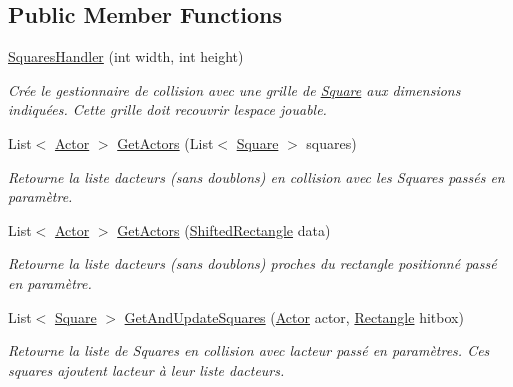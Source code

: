 \subsection*{Public Member Functions}
\begin{DoxyCompactItemize}
\item 
\hyperlink{class_tentacle_slicers_1_1maps_1_1_squares_handler_a359564e42a93abcbfab17e27a96923c0}{Squares\+Handler} (int width, int height)
\begin{DoxyCompactList}\small\item\em Crée le gestionnaire de collision avec une grille de \hyperlink{class_tentacle_slicers_1_1maps_1_1_square}{Square} aux dimensions indiquées. Cette grille doit recouvrir l\textquotesingle{}espace jouable. \end{DoxyCompactList}\item 
List$<$ \hyperlink{class_tentacle_slicers_1_1actors_1_1_actor}{Actor} $>$ \hyperlink{class_tentacle_slicers_1_1maps_1_1_squares_handler_a757757f75b4fc5fd74739f3d55ea7e00}{Get\+Actors} (List$<$ \hyperlink{class_tentacle_slicers_1_1maps_1_1_square}{Square} $>$ squares)
\begin{DoxyCompactList}\small\item\em Retourne la liste d\textquotesingle{}acteurs (sans doublons) en collision avec les Squares passés en paramètre. \end{DoxyCompactList}\item 
List$<$ \hyperlink{class_tentacle_slicers_1_1actors_1_1_actor}{Actor} $>$ \hyperlink{class_tentacle_slicers_1_1maps_1_1_squares_handler_a80e39f9258518ba76d3a8f82ffff0947}{Get\+Actors} (\hyperlink{struct_tentacle_slicers_1_1collisions_1_1_shifted_rectangle}{Shifted\+Rectangle} data)
\begin{DoxyCompactList}\small\item\em Retourne la liste d\textquotesingle{}acteurs (sans doublons) proches du rectangle positionné passé en paramètre. \end{DoxyCompactList}\item 
List$<$ \hyperlink{class_tentacle_slicers_1_1maps_1_1_square}{Square} $>$ \hyperlink{class_tentacle_slicers_1_1maps_1_1_squares_handler_a77fb8f2f5483270a7db4b505806e1608}{Get\+And\+Update\+Squares} (\hyperlink{class_tentacle_slicers_1_1actors_1_1_actor}{Actor} actor, \hyperlink{class_tentacle_slicers_1_1collisions_1_1_rectangle}{Rectangle} hitbox)
\begin{DoxyCompactList}\small\item\em Retourne la liste de Squares en collision avec l\textquotesingle{}acteur passé en paramètres. Ces squares ajoutent l\textquotesingle{}acteur à leur liste d\textquotesingle{}acteurs. \end{DoxyCompactList}\item 

\end{DoxyCompactItemize}
